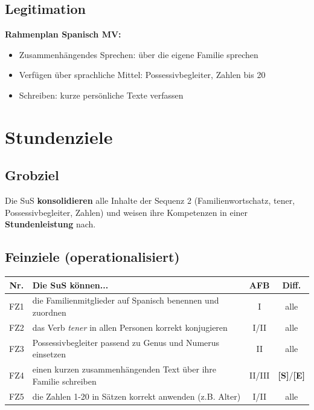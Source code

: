 \documentclass[11pt,a4paper]{article}
\newcommand{\Std}{\textcolor{standard}{\textbf{[S]}}}
\newcommand{\E}{\textcolor{erweiterung}{\textbf{[E]}}}
\begin{document}
\subsection{Legitimation}
\textbf{Rahmenplan Spanisch MV:}
\begin{itemize}
    \item Zusammenhängendes Sprechen: über die eigene Familie sprechen
    \item Verfügen über sprachliche Mittel: Possessivbegleiter, Zahlen bis 20
    \item Schreiben: kurze persönliche Texte verfassen
\end{itemize}

\section{Stundenziele}

\subsection{Grobziel}
Die SuS \textbf{konsolidieren} alle Inhalte der Sequenz 2 (Familienwortschatz, tener, Possessivbegleiter, Zahlen) und weisen ihre Kompetenzen in einer \textbf{Stundenleistung} nach.

\subsection{Feinziele (operationalisiert)}
\begin{tabular}{|c|p{8cm}|c|c|}
\hline
\textbf{Nr.} & \textbf{Die SuS können...} & \textbf{AFB} & \textbf{Diff.} \\
\hline
FZ1 & die Familienmitglieder auf Spanisch benennen und zuordnen & I & alle \\
\hline
FZ2 & das Verb \textit{tener} in allen Personen korrekt konjugieren & I/II & alle \\
\hline
FZ3 & Possessivbegleiter passend zu Genus und Numerus einsetzen & II & alle \\
\hline
FZ4 & einen kurzen zusammenhängenden Text über ihre Familie schreiben & II/III & \Std{}/\E{} \\
\hline
FZ5 & die Zahlen 1-20 in Sätzen korrekt anwenden (z.B. Alter) & I/II & alle \\
\hline
\end{tabular}
\end{document}
